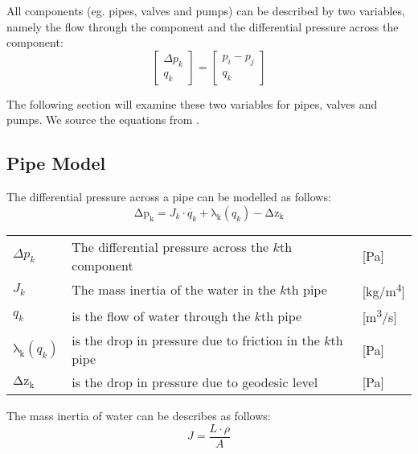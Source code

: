 All components (eg. pipes, valves and pumps) can be described by two variables, namely the flow through the component and the differential pressure across the component:
\begin{equation}
\begin{bmatrix} \Delta{p_{k}} \\ q_{k} \end{bmatrix} = 
\begin{bmatrix} p_{i} - p_{j} \\ q_{k} \end{bmatrix}    
\end{equation}

The following section will examine these two variables for pipes, valves and pumps. We source the equations from \cite{MathiasBjarni2015}.

\subsection{Pipe Model}\label{subsec:PipeModel}
The differential pressure across a pipe can be modelled as follows:
\begin{equation}
    \mathrm{\Delta{p_{k}}} = J_{k}\cdot\dot{q_{k}}+\mathrm{\lambda_{k}}(q_{k})-\mathrm{\Delta{z_{k}}}
    \label{eq:Delta_p_pipe}
\end{equation}


	\begin{center}
		\begin{tabular}{l p{10cm} l}
			
			$\Delta{p_{k}}$ & The differential pressure across the $k$th component & [\si{Pa}]\\ 
		  	${J_{k}}$ & The mass inertia of the water in the $k$th pipe & [\si{kg}/\si{m^{4}}] \\
		  	$q_{k}$ & is the flow of water through the $k$th pipe & [{\si{\meter\cubed}/\si{s}}] \\
		  	$\mathrm{\lambda_{k}}(q_{k})$ & is the drop in pressure due to friction in the $k$th pipe & [\si{Pa}] \\
		  	$\mathrm{\Delta{z_{k}}}$ & is the drop in pressure due to geodesic level & [\si{Pa}]\\
			\end{tabular}
	\end{center}

The mass inertia of water can be describes as follows:
\begin{equation}
	J= \frac{L\cdot \rho}{A}
\end{equation}

